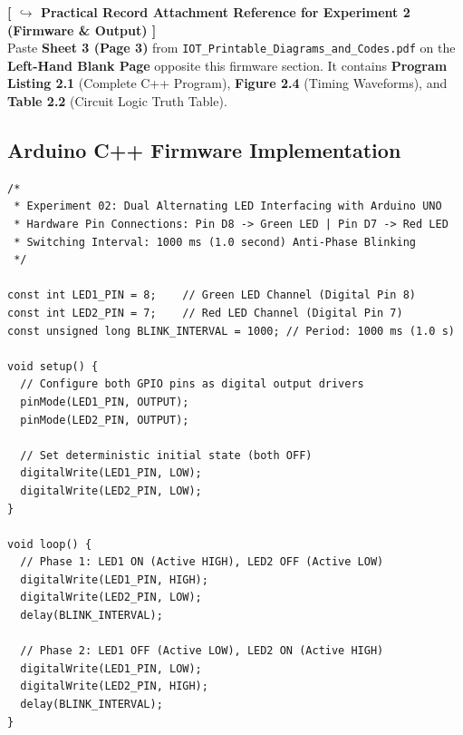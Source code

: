 \documentclass[11pt,a4paper]{article}
\begin{document}
\begin{attachmentbox}
\footnotesize
\textbf{[ $\hookrightarrow$ Practical Record Attachment Reference for Experiment 2 (Firmware \& Output) ]}\\
Paste \textbf{Sheet 3 (Page 3)} from \texttt{IOT\_Printable\_Diagrams\_and\_Codes.pdf} on the \textbf{Left-Hand Blank Page} opposite this firmware section. It contains \textbf{Program Listing 2.1} (Complete C++ Program), \textbf{Figure 2.4} (Timing Waveforms), and \textbf{Table 2.2} (Circuit Logic Truth Table).
\end{attachmentbox}

\subsection{Arduino C++ Firmware Implementation}
\begin{lstlisting}[style=bwArduino, caption={Arduino C++ Program for Dual Alternating LED Blinking.}]
/*
 * Experiment 02: Dual Alternating LED Interfacing with Arduino UNO
 * Hardware Pin Connections: Pin D8 -> Green LED | Pin D7 -> Red LED
 * Switching Interval: 1000 ms (1.0 second) Anti-Phase Blinking
 */

const int LED1_PIN = 8;    // Green LED Channel (Digital Pin 8)
const int LED2_PIN = 7;    // Red LED Channel (Digital Pin 7)
const unsigned long BLINK_INTERVAL = 1000; // Period: 1000 ms (1.0 s)

void setup() {
  // Configure both GPIO pins as digital output drivers
  pinMode(LED1_PIN, OUTPUT);
  pinMode(LED2_PIN, OUTPUT);
  
  // Set deterministic initial state (both OFF)
  digitalWrite(LED1_PIN, LOW);
  digitalWrite(LED2_PIN, LOW);
}

void loop() {
  // Phase 1: LED1 ON (Active HIGH), LED2 OFF (Active LOW)
  digitalWrite(LED1_PIN, HIGH);
  digitalWrite(LED2_PIN, LOW);
  delay(BLINK_INTERVAL);
  
  // Phase 2: LED1 OFF (Active LOW), LED2 ON (Active HIGH)
  digitalWrite(LED1_PIN, LOW);
  digitalWrite(LED2_PIN, HIGH);
  delay(BLINK_INTERVAL);
}
\end{lstlisting}
\end{document}
